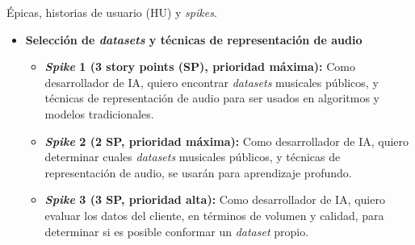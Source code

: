 \documentclass[
11pt, %
]{charter}
\begin{document}
Épicas, historias de usuario (HU) y \textit{spikes}.

\begin{itemize}
  \item \textbf{Selección de \textit{datasets} y técnicas de representación de audio}
    \begin{itemize}
      \item \textbf{\textit{Spike} 1 (3 story points (SP), prioridad máxima):}
      Como desarrollador de IA, quiero encontrar \textit{datasets} musicales públicos, y técnicas de representación de audio para ser usados en algoritmos y modelos tradicionales.
      \item \textbf{\textit{Spike} 2 (2 SP, prioridad máxima):}
      Como desarrollador de IA, quiero determinar cuales \textit{datasets} musicales públicos, y técnicas de representación de audio, se usarán para aprendizaje profundo.      
      \item \textbf{\textit{Spike} 3 (3 SP, prioridad alta):}
      Como desarrollador de IA, quiero evaluar los datos del cliente, en términos de volumen y calidad, para determinar si es posible conformar un \textit{dataset} propio.


\end{itemize}
\end{itemize}
\end{document}
